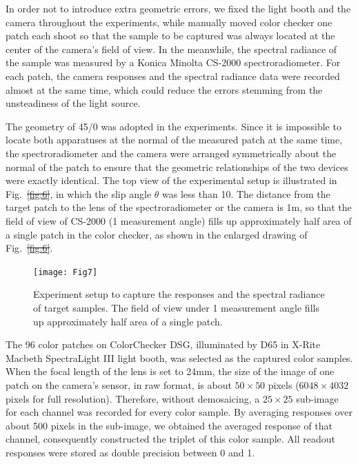 \documentclass[9pt,twocolumn,twoside]{osajnl}
\providecommand{\DIFadd}[1]{{\protect\color{blue}\uwave{#1}}} %
\providecommand{\DIFdel}[1]{{\protect\color{red}\sout{#1}}}                      %
\providecommand{\DIFaddbegin}{} %
\providecommand{\DIFaddend}{} %
\providecommand{\DIFdelbegin}{} %
\providecommand{\DIFdelend}{} %
\providecommand{\DIFaddbeginFL}{} %
\providecommand{\DIFaddendFL}{} %
\providecommand{\DIFdelbeginFL}{} %
\providecommand{\DIFdelendFL}{} %
\begin{document}
In order not to introduce extra geometric errors, we fixed the light booth and the camera throughout the experiments, while manually moved color checker one patch each shoot so that the sample to be captured was always located at the center of the camera’s field of view. In the meanwhile, the spectral radiance of the sample was measured by a Konica Minolta CS-2000 spectroradiometer. For each patch, the camera responses and the spectral radiance data were recorded almost at the same time, which could reduce the errors stemming from the unsteadiness of the light source.

The geometry of 45\textdegree{}/0\textdegree{} was adopted in the experiments. Since it is impossible to locate both apparatuses at the normal of the measured patch at the same time, the spectroradiometer and the camera were arranged symmetrically about the normal of the patch to ensure that the geometric relationships of the two devices were exactly identical. The top view of the experimental setup is illustrated in Fig.~\DIFdelbegin \DIFdel{\ref{fig:6}}\DIFdelend \DIFaddbegin \DIFadd{\ref{fig:7}}\DIFaddend , in which the slip angle $\theta$ was less than 10\textdegree. The distance from the target patch to the lens of the spectroradiometer or the camera is 1m, so that the field of view of CS-2000 (1\textdegree{} measurement angle) fills up approximately half area of a single patch in the color checker, as shown in the enlarged drawing of Fig.~\DIFdelbegin \DIFdel{\ref{fig:6}}\DIFdelend \DIFaddbegin \DIFadd{\ref{fig:7}}\DIFaddend . 

\begin{figure}[tbp]
	\centering
	\DIFdelbeginFL %
\DIFdelendFL \DIFaddbeginFL \texttt{[image: Fig7]}
	\DIFaddendFL \caption{Experiment setup to capture the responses and the spectral radiance of target samples. The field of view under 1\textdegree{} measurement angle fills up approximately half area of a single patch.}
	\DIFdelbeginFL %
\DIFdelendFL \DIFaddbeginFL \label{fig:7}
\DIFaddendFL \end{figure}

The 96 color patches on ColorChecker DSG, illuminated by D65 in X-Rite Macbeth SpectraLight III light booth, was selected as the captured color samples. When the focal length of the lens is set to 24mm, the size of the image of one patch on the camera’s sensor, in raw format, is about $50\times50$ pixels ($6048\times4032$ pixels for full resolution). Therefore, without demosaicing, a $25\times25$ sub-image for each channel was recorded for every color sample. By averaging responses over about 500 pixels in the sub-image, we obtained the averaged response of that channel, consequently constructed the triplet of this color sample. All readout responses were stored as double precision between 0 and 1.
\end{document}
